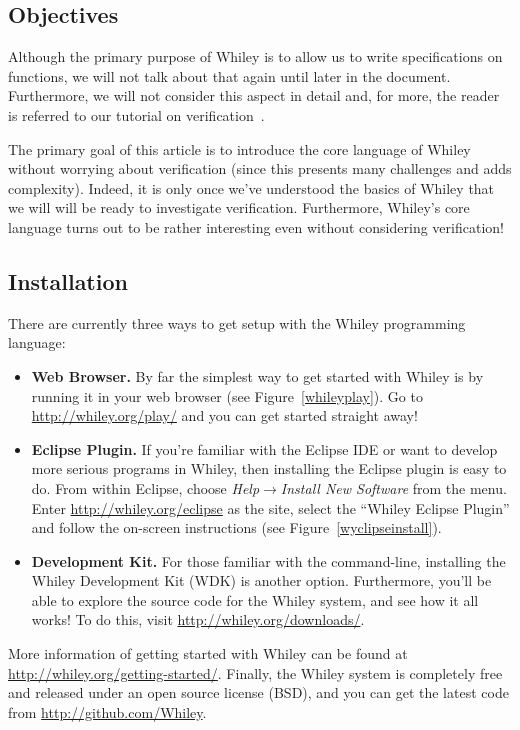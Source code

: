 \subsection{Objectives}

Although the primary purpose of Whiley is to allow us to write
specifications on functions, we will not talk about that again until
later in the document.  Furthermore, we will not consider this aspect
in detail and, for more, the reader is referred to our tutorial on
verification~\cite{Pea13x}.

The primary goal of this article is to introduce the core language of
Whiley without worrying about verification (since this presents many
challenges and adds complexity).  Indeed, it is only once we've
understood the basics of Whiley that we will will be ready to
investigate verification.  Furthermore, Whiley's core language turns
out to be rather interesting even without considering verification!

\subsection{Installation}

There are currently three ways to get setup with the Whiley
programming language:

\begin{itemize}
\item {\bf Web Browser.} By far the simplest way to get started with
  Whiley is by running it in your web browser (see
  Figure~\ref{whileyplay}).  Go to \url{http://whiley.org/play/} and
  you can get started straight away!
\item {\bf Eclipse Plugin.} If you're familiar with the Eclipse IDE or
  want to develop more serious programs in Whiley, then installing the
  Eclipse plugin is easy to do.  From within Eclipse, choose {\em
    Help$\rightarrow$Install New Software} from the menu.  Enter
  \url{http://whiley.org/eclipse} as the site, select the ``Whiley
  Eclipse Plugin'' and follow the on-screen instructions (see Figure~\ref{wyclipseinstall}).
\item {\bf Development Kit.} For those familiar with the command-line,
  installing the Whiley Development Kit (WDK) is another option.
  Furthermore, you'll be able to explore the source code for the
  Whiley system, and see how it all works!  To do this, visit
  \url{http://whiley.org/downloads/}.
\end{itemize}

More information of getting started with Whiley can be found at
\url{http://whiley.org/getting-started/}.  Finally, the Whiley system
is completely free and released under an open source license (BSD),
and you can get the latest code from \url{http://github.com/Whiley}.

